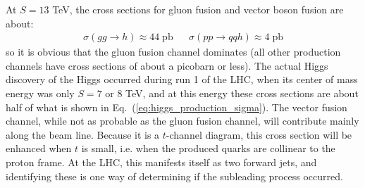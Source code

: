 \documentclass[11pt, oneside]{article}   	%
\theoremstyle{definition}
\numberwithin{equation}{subsection}		%
\begin{document}
At $S = 13$ TeV, the cross sections for gluon fusion and vector boson fusion are about:
\begin{align}
	\sigma(gg\rightarrow h)\approx 44\;\mathrm{pb} && \sigma(pp\rightarrow qq h)\approx 4\;\mathrm{pb}
	\label{eq:higgs_production_sigma}
\end{align}
so it is obvious that the gluon fusion channel dominates (all other production channels have cross sections of about a picobarn or less). 
The actual Higgs discovery of the Higgs occurred during run 1 of the LHC, when its center of mass energy was only $S = 7$ or $8$ TeV, and 
at this energy these cross sections are about half of what is shown in Eq.~(\ref{eq:higgs_production_sigma}). The vector fusion channel, 
while not as probable as the gluon fusion channel, will contribute mainly along the beam line. Because it is a $t$-channel diagram, this 
cross section will be enhanced when $t$ is small, i.e. when the produced quarks are collinear to the proton frame. At the LHC, this manifests 
itself as two forward jets, and identifying these is one way of determining if the subleading process occurred. 
\end{document}
